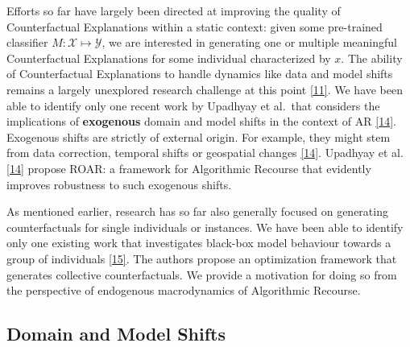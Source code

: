 \documentclass[conference,final,]{IEEEtran}
\theoremstyle{definition}
\theoremstyle{definition}
\theoremstyle{definition}
\theoremstyle{definition}
\theoremstyle{remark}
\begin{document}
Efforts so far have largely been directed at improving the quality of Counterfactual Explanations within a static context: given some pre-trained classifier \(M: \mathcal{X} \mapsto \mathcal{Y}\), we are interested in generating one or multiple meaningful Counterfactual Explanations for some individual characterized by \(x\). The ability of Counterfactual Explanations to handle dynamics like data and model shifts remains a largely unexplored research challenge at this point \protect\hyperlink{ref-verma2020counterfactual}{{[}11{]}}. We have been able to identify only one recent work by Upadhyay et al.~that considers the implications of \textbf{exogenous} domain and model shifts in the context of AR \protect\hyperlink{ref-upadhyay2021robust}{{[}14{]}}. Exogenous shifts are strictly of external origin. For example, they might stem from data correction, temporal shifts or geospatial changes \protect\hyperlink{ref-upadhyay2021robust}{{[}14{]}}. Upadhyay et al. \protect\hyperlink{ref-upadhyay2021robust}{{[}14{]}} propose ROAR: a framework for Algorithmic Recourse that evidently improves robustness to such exogenous shifts.

As mentioned earlier, research has so far also generally focused on generating counterfactuals for single individuals or instances. We have been able to identify only one existing work that investigates black-box model behaviour towards a group of individuals \protect\hyperlink{ref-carrizosa2021generating}{{[}15{]}}. The authors propose an optimization framework that generates collective counterfactuals. We provide a motivation for doing so from the perspective of endogenous macrodynamics of Algorithmic Recourse.

\hypertarget{related-shifts}{%
\subsection{Domain and Model Shifts}\label{related-shifts}}
\end{document}

